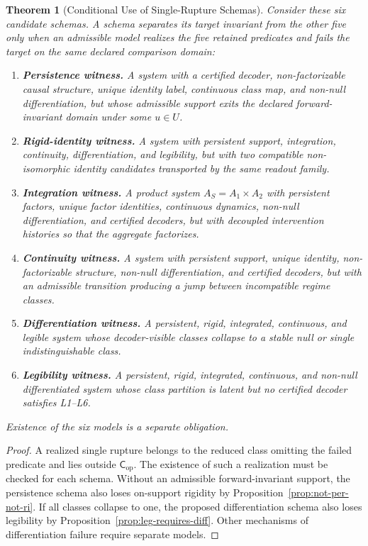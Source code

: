 \documentclass[11pt,a4paper]{article}
\newtheorem{theorem}{Theorem}[section]
\theoremstyle{definition}
\newcommand{\Cop}{\mathsf{C}_{\mathrm{op}}}
\begin{document}
\begin{theorem}[Conditional Use of Single-Rupture Schemas]\label{thm:six-witness-schemas}
Consider these six candidate schemas. A schema separates its target invariant
from the other five only when an admissible model realizes the five retained
predicates and fails the target on the same declared comparison domain:
\begin{enumerate}[leftmargin=1.5em]
\item \textbf{Persistence witness.} A system with a certified decoder,
non-factorizable causal structure, unique identity label, continuous class map,
and non-null differentiation, but whose admissible support exits the declared
forward-invariant domain under some $u\in U$.
\item \textbf{Rigid-identity witness.} A system with persistent support,
integration, continuity, differentiation, and legibility, but with two
compatible non-isomorphic identity candidates transported by the same readout
family.
\item \textbf{Integration witness.} A product system
$A_S=A_1\times A_2$ with persistent factors, unique factor identities,
continuous dynamics, non-null differentiation, and certified decoders, but with
decoupled intervention histories so that the aggregate factorizes.
\item \textbf{Continuity witness.} A system with persistent support, unique
identity, non-factorizable structure, non-null differentiation, and certified
decoders, but with an admissible transition producing a jump between
incompatible regime classes.
\item \textbf{Differentiation witness.} A persistent, rigid, integrated,
continuous, and legible system whose decoder-visible classes collapse to a
stable null or single indistinguishable class.
\item \textbf{Legibility witness.} A persistent, rigid, integrated, continuous,
and non-null differentiated system whose class partition is latent but no
certified decoder satisfies L1--L6.
\end{enumerate}
Existence of the six models is a separate obligation.
\end{theorem}

\begin{proof}
A realized single rupture belongs to the reduced class omitting the failed predicate and lies outside $\Cop$. The existence of such a realization must be checked for each schema. Without an admissible forward-invariant support, the persistence schema also loses on-support rigidity by Proposition~\ref{prop:not-per-not-ri}. If all classes collapse to one, the proposed differentiation schema also loses legibility by Proposition~\ref{prop:leg-requires-diff}. Other mechanisms of differentiation failure require separate models.
\end{proof}
\end{document}
